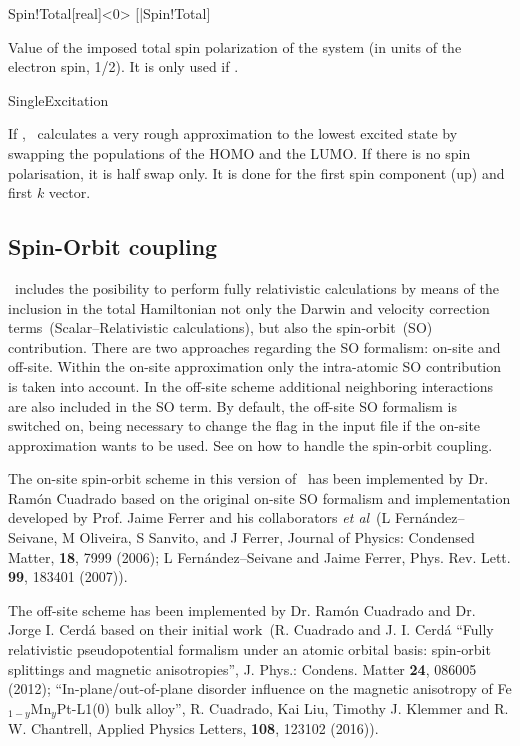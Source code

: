 \begin{fdfentry}{Spin!Total}[real]<$0$>
  [|Spin!Total]
  
  Value of the imposed total spin polarization of the system (in units
  of the electron spin, 1/2). It is only used if  \fdftrue.
  
\end{fdfentry}

\begin{fdflogicalF}{SingleExcitation}

  If \fdftrue, \siesta\ calculates a very rough approximation to the
  lowest excited state by swapping the populations of the HOMO and the
  LUMO. If there is no spin polarisation, it is half swap only.  It is
  done for the first spin component (up) and first $k$ vector.
  
\end{fdflogicalF}


\subsection{Spin-Orbit coupling}
\label{sec:spin-orbit}

\siesta\ includes the posibility to perform fully relativistic
calculations by means of the inclusion in the total Hamiltonian not
only the Darwin and velocity correction terms~(Scalar--Relativistic
calculations), but also the spin-orbit~(SO) contribution. There are
two approaches regarding the SO formalism: on-site and off-site.
Within the on-site approximation only the intra-atomic SO
contribution is taken into account. In the off-site scheme additional
neighboring interactions are also included in the SO term. By default,
the off-site SO formalism is switched on, being necessary to change
the  flag in the input file if the on-site approximation
wants to be used. See  on how to handle the spin-orbit
coupling.

The on-site spin-orbit scheme in this version of \siesta\ has been implemented by
Dr. Ram\'on Cuadrado based on the original on-site SO formalism and
implementation developed by Prof. Jaime Ferrer and his collaborators \textit{et al}~(L
Fern\'andez--Seivane, M Oliveira, S Sanvito, and J Ferrer, Journal of
Physics: Condensed Matter, \textbf{18}, 7999 (2006); L Fern\'andez--Seivane 
and Jaime Ferrer, Phys. Rev. Lett. \textbf{99}, 183401 (2007)).

The off-site scheme has been implemented by
Dr. Ram\'on Cuadrado and Dr. Jorge I. Cerd\'a based on their initial 
work~(R. Cuadrado and J. I. Cerd\'a ``Fully relativistic pseudopotential 
formalism under an atomic orbital basis: spin-orbit splittings and 
magnetic anisotropies'', J. Phys.: Condens. Matter \textbf{24}, 086005 (2012); 
``In-plane/out-of-plane disorder influence on the magnetic anisotropy of 
Fe$_{1-y}$Mn$_y$Pt-L1(0) bulk alloy'', R. Cuadrado, Kai Liu, Timothy 
J. Klemmer and R. W. Chantrell, Applied Physics Letters, \textbf{108}, 
123102 (2016)).  

